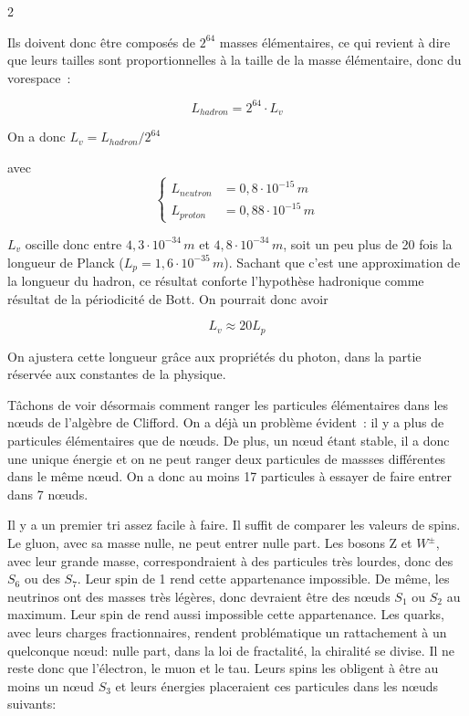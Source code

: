 \begin{multicols}{2}
\begin{table}[H]
\end{table}

Ils doivent donc être composés de $2^{64}$ masses élémentaires, ce qui
revient à dire que leurs tailles sont proportionnelles à la taille de la
masse élémentaire, donc du vorespace :

\begin{equation*}
	L_{hadron}  = 2^{64} \cdot L_v
\end{equation*}


On a donc $L_v = L_{hadron}/2^{64}$

avec
\begin{equation*}
	\left\{
		\begin{split}
	 		L_{neutron} &= 0,8 \cdot 10^{-15}\,m  \\ 
	 		L_{proton}  &= 0,88 \cdot 10^{-15}\,m 
		\end{split}
	\right.
\end{equation*}

$L_v$ oscille donc entre $4,3 \cdot 10^{-34}\,m$ et $4,8 \cdot 10^{-34}\,m$, soit un peu plus
de 20 fois la longueur de Planck ($L_p=1,6 \cdot 10^{-35}\,m$). Sachant que c'est
une approximation de la longueur du hadron, ce résultat conforte
l'hypothèse hadronique comme résultat de la périodicité de Bott. On
pourrait donc avoir


\begin{equation*}
	L_v \approx 20 L_p
\end{equation*}

On ajustera cette longueur grâce aux propriétés du photon, dans la
partie réservée aux constantes de la physique.
\medskip

Tâchons de voir désormais comment ranger les particules élémentaires
dans les nœuds de l'algèbre de Clifford. On a déjà un problème
évident : il y a plus de particules élémentaires que de nœuds. De
plus, un nœud étant stable, il a donc une unique énergie et on ne peut
ranger deux particules de massses différentes dans le même nœud. On a
donc au moins 17 particules à essayer de faire entrer dans 7
nœuds.

Il y a un premier tri assez facile à faire. Il suffit de comparer les
valeurs de spins. Le gluon, avec sa masse nulle, ne peut entrer nulle
part. Les bosons Z et $W^\pm$, avec leur grande masse, correspondraient à
des particules très lourdes, donc des $S_6$ ou des $S_7$. Leur spin de 1
rend cette appartenance impossible. De même, les neutrinos ont des
masses très légères, donc devraient être des nœuds $S_1$ ou $S_2$ au
maximum. Leur spin de  rend aussi impossible cette appartenance.
Les quarks, avec leurs charges fractionnaires, rendent problématique
un rattachement à un quelconque nœud: nulle part, dans la loi de
fractalité, la chiralité se divise. Il ne reste donc que l'électron,
le muon et le tau. Leurs spins les obligent à être au moins un nœud
$S_3$ et leurs énergies placeraient ces particules dans les nœuds
suivants:


\end{multicols}
